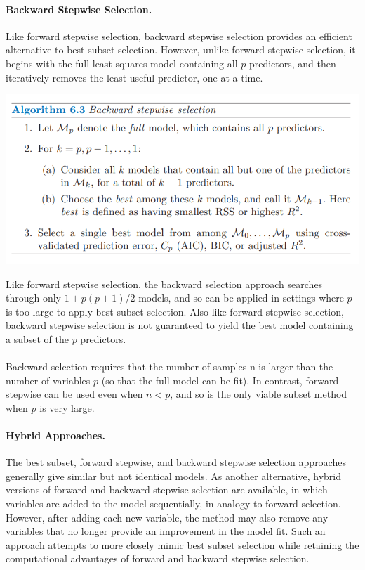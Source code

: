 \paragraph{Backward Stepwise Selection.} Like forward stepwise selection, backward stepwise selection provides an efficient alternative to best subset selection. However, unlike forward stepwise selection, it begins with the full least squares model containing all $p$ predictors, and then iteratively removes the least useful predictor, one-at-a-time.
\begin{center}
    \includegraphics[scale=0.7]{images/backward stepwise.png}
\end{center}
Like forward stepwise selection, the backward selection approach searches
through only $1+p(p+ 1)/2$ models, and so can be applied in settings where
$p$ is too large to apply best subset selection. Also like forward stepwise
selection, backward stepwise selection is not guaranteed to yield the best
model containing a subset of the $p$ predictors.\\\\
Backward selection requires that the number of samples n is larger than
the number of variables $p$ (so that the full model can be fit). In contrast,
forward stepwise can be used even when $n<p$, and so is the only viable
subset method when $p$ is very large.
\paragraph{Hybrid Approaches.} The best subset, forward stepwise, and backward stepwise selection approaches generally give similar but not identical models. As another alternative, hybrid versions of forward and backward stepwise selection are available, in which variables are added to the model sequentially, in analogy to forward selection. However, after adding each new variable, the method may also remove any variables that no longer provide an improvement in the model fit. Such an approach attempts to more closely mimic best subset selection while retaining the computational advantages of forward and backward stepwise selection.

